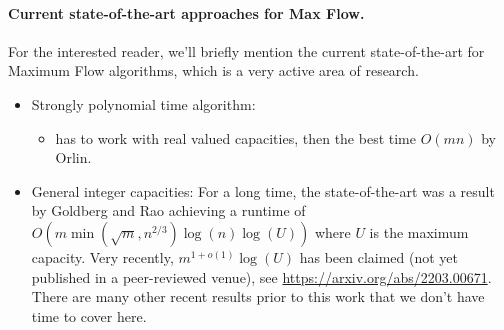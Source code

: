 \paragraph{Current state-of-the-art approaches for Max Flow.} For the
interested reader, we'll briefly mention the current state-of-the-art
for Maximum Flow algorithms, which is a  very active area of research.
\begin{itemize}
    \item Strongly polynomial time algorithm:
     \begin{itemize}
       \item has to work with real valued capacities, then the best time $O(mn)$ by Orlin.
    \end{itemize}
  \item General integer capacities: For a long time, the
    state-of-the-art was a result by Goldberg and Rao achieving a
    runtime of \(O(m \min(\sqrt{m},n^{2/3}) \log(n) \log(U) )\) where $U$ is the
    maximum capacity.
    Very recently, $m^{1+o(1)}\log(U)$ has been claimed (not yet
    published in a peer-reviewed venue), see
    \url{https://arxiv.org/abs/2203.00671}. There are many other recent results 
prior to this work that we don't have time to cover here.
\end{itemize}
%







